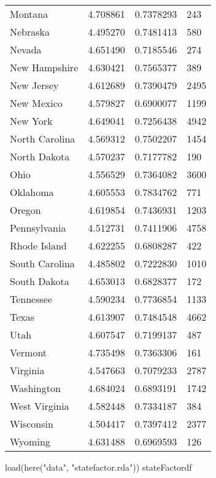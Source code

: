 \documentclass[
]{article}
\newenvironment{Shaded}{\begin{snugshade}}{\end{snugshade}}
\newcommand{\FunctionTok}[1]{\textcolor[rgb]{0.00,0.00,0.00}{#1}}
\newcommand{\NormalTok}[1]{#1}
\newcommand{\StringTok}[1]{\textcolor[rgb]{0.31,0.60,0.02}{#1}}
\begin{document}
\begin{landscape}
\begin{longtable}[t]{llll}
\addlinespace
Montana & 4.708861 & 0.7378293 & 243\\
Nebraska & 4.495270 & 0.7481413 & 580\\
Nevada & 4.651490 & 0.7185546 & 274\\
New Hampshire & 4.630421 & 0.7565377 & 389\\
New Jersey & 4.612689 & 0.7390479 & 2495\\
\addlinespace
New Mexico & 4.579827 & 0.6900077 & 1199\\
New York & 4.649041 & 0.7256438 & 4942\\
North Carolina & 4.569312 & 0.7502207 & 1454\\
North Dakota & 4.570237 & 0.7177782 & 190\\
Ohio & 4.556529 & 0.7364082 & 3600\\
\addlinespace
Oklahoma & 4.605553 & 0.7834762 & 771\\
Oregon & 4.619854 & 0.7436931 & 1203\\
Pennsylvania & 4.512731 & 0.7411906 & 4758\\
Rhode Island & 4.622255 & 0.6808287 & 422\\
South Carolina & 4.485802 & 0.7222830 & 1010\\
\addlinespace
South Dakota & 4.653013 & 0.6828377 & 172\\
Tennessee & 4.590234 & 0.7736854 & 1133\\
Texas & 4.613907 & 0.7484548 & 4662\\
Utah & 4.607547 & 0.7199137 & 487\\
Vermont & 4.735498 & 0.7363306 & 161\\
\addlinespace
Virginia & 4.547663 & 0.7079233 & 2787\\
Washington & 4.684024 & 0.6893191 & 1742\\
West Virginia & 4.582448 & 0.7334187 & 384\\
Wisconsin & 4.504417 & 0.7397412 & 2377\\
Wyoming & 4.631488 & 0.6969593 & 126\\*
\end{longtable}
\end{landscape}
\endgroup{}

\begin{Shaded}
\begin{Highlighting}[]
\FunctionTok{load}\NormalTok{(}\FunctionTok{here}\NormalTok{(}\StringTok{"data"}\NormalTok{, }\StringTok{"statefactor.rda"}\NormalTok{))}
\NormalTok{stateFactordf}
\end{Highlighting}
\end{Shaded}
\end{document}
